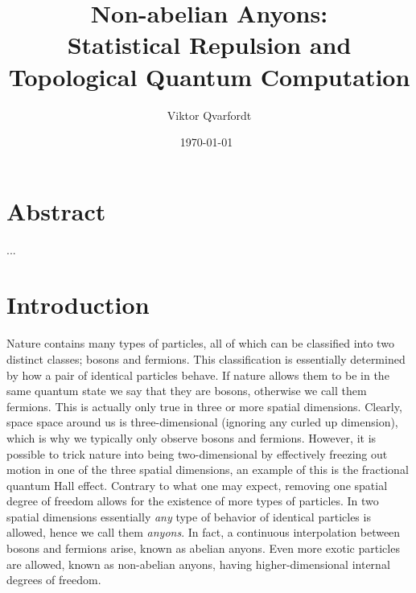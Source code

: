 \documentclass[a4paper,10pt,oneside]{book}
\theoremstyle{plain}
\theoremstyle{definition}
\theoremstyle{remark}
\begin{document}


\title{Non-abelian Anyons:\\Statistical Repulsion and\\Topological Quantum Computation}
\author{Viktor Qvarfordt}
\date{\isodate\today\ \currenttime}


\maketitle

\chapter*{Abstract}

...

\tableofcontents

\newpage

















\chapter{Introduction}

Nature contains many types of particles, all of which can be classified into two distinct classes; bosons and fermions. This classification is essentially determined by how a pair of identical particles behave. If nature allows them to be in the same quantum state we say that they are bosons, otherwise we call them fermions. This is actually only true in three or more spatial dimensions. Clearly, space space around us is three-dimensional (ignoring any curled up dimension), which is why we typically only observe bosons and fermions. However, it is possible to trick nature into being two-dimensional by effectively freezing out motion in one of the three spatial dimensions, an example of this is the fractional quantum Hall effect. Contrary to what one may expect, removing one spatial degree of freedom allows for the existence of more types of particles. In two spatial dimensions essentially \emph{any} type of behavior of identical particles is allowed, hence we call them \emph{anyons}. In fact, a continuous interpolation between bosons and fermions arise, known as abelian anyons. Even more exotic particles are allowed, known as non-abelian anyons, having higher-dimensional internal degrees of freedom.
\end{document}
